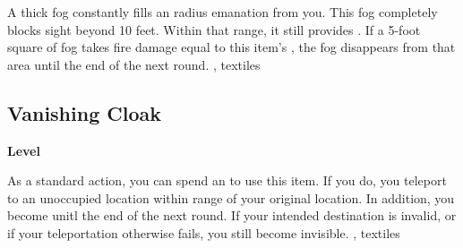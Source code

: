 \vspace{-1.5em}  %
A thick fog constantly fills an \areamed radius emanation from you.
This fog completely blocks sight beyond 10 feet.
Within that range, it still provides \concealment.
If a 5-foot square of fog takes fire damage equal to this item's , the fog disappears from that area until the end of the next round.
 , 
 textiles
\begin{multicols}{2}
\lowercase{\hypertarget{item:Vanishing Cloak}{}}\label{item:Vanishing Cloak}
\hypertarget{item:Vanishing Cloak}{\subsection{Vanishing Cloak}}
\columnbreak%
\begin{flushright}
\large\textbf{ Level}
\end{flushright}
\end{multicols}
\vspace{-1.5em}  %
As a standard action, you can spend an  to use this item.
If you do, you teleport to an unoccupied location within \rngmed range of your original location.
In addition, you become  unitl the end of the next round.
If your intended destination is invalid, or if your teleportation otherwise fails, you still become invisible.
 , 
 textiles